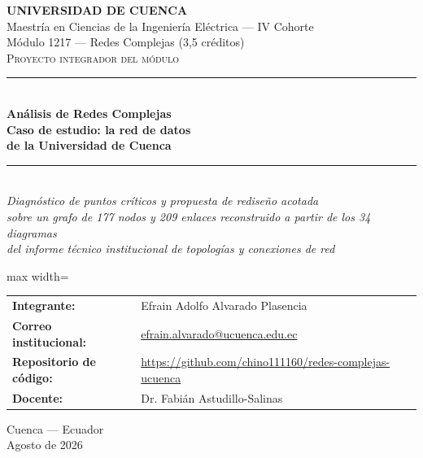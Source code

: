 \documentclass[10pt,a4paper]{extarticle}
\begin{document}
\begin{titlepage}
\thispagestyle{empty}
\begin{center}
\vspace*{5mm}
{\Large\textbf{\textcolor{azulucuenca}{UNIVERSIDAD DE CUENCA}}}\\[3mm]
{\large Maestría en Ciencias de la Ingeniería Eléctrica --- IV Cohorte}\\[1.5mm]
{\large Módulo 1217 --- Redes Complejas (3,5 créditos)}\\[22mm]

{\large\textsc{Proyecto integrador del módulo}}\\[8mm]

\textcolor{azulucuenca}{\rule{0.85\textwidth}{1.2pt}}\\[5mm]
{\Huge\bfseries\textcolor{azulucuenca}{Análisis de Redes Complejas}}\\[5mm]
{\Large\bfseries Caso de estudio: la red de datos\\[1mm] de la Universidad de Cuenca}\\[5mm]
\textcolor{azulucuenca}{\rule{0.85\textwidth}{1.2pt}}\\[8mm]

{\normalsize\itshape Diagnóstico de puntos críticos y propuesta de rediseño acotada\\
sobre un grafo de 177 nodos y 209 enlaces reconstruido a partir de los 34 diagramas\\
del informe técnico institucional de topologías y conexiones de red}\\[22mm]

\begin{adjustbox}{max width=\textwidth}
\begin{tabular}{ll}
\textbf{Integrante:} & Efrain Adolfo Alvarado Plasencia \\[1.5mm]
\textbf{Correo institucional:} & \href{mailto:efrain.alvarado@ucuenca.edu.ec}{efrain.alvarado@ucuenca.edu.ec} \\[1.5mm]
\textbf{Repositorio de código:} & \url{https://github.com/chino111160/redes-complejas-ucuenca} \\[1.5mm]
\textbf{Docente:} & Dr. Fabián Astudillo-Salinas \\
\end{tabular}

\vspace{25mm}
\end{adjustbox}

\vfill
{\large Cuenca --- Ecuador}\\[2mm]
{\large Agosto de 2026}
\end{center}
\end{titlepage}
\end{document}
